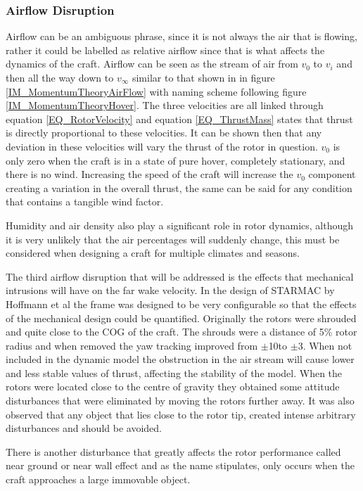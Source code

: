 \subsubsection{Airflow Disruption}
Airflow can be an ambiguous phrase, since it is not always the air that is flowing, rather it could be labelled as relative airflow since that is what affects the dynamics of the craft. Airflow can be seen as the stream of air from $v_0$ to $v_i$ and then all the way down to $v_\infty$ similar to that shown in in figure \ref{IM_MomentumTheoryAirFlow} with naming scheme following figure \ref{IM_MomentumTheoryHover}. The three velocities are all linked through equation \ref{EQ_RotorVelocity} and equation \ref{EQ_ThrustMass} states that thrust is directly proportional to these velocities. It can be shown then that any deviation in these velocities will vary the thrust of the rotor in question. $v_0$ is only zero when the craft is in a state of pure hover, completely stationary, and there is no wind. Increasing the speed of the craft will increase the $v_0$ component creating a variation in the overall thrust, the same can be said for any condition that contains a tangible wind factor. 

Humidity and air density also play a significant role in rotor dynamics, although it is very unlikely that the air percentages will suddenly change, this must be considered when designing a craft for multiple climates and seasons.

The third airflow disruption that will be addressed is the effects that mechanical intrusions will have on the far wake velocity. In the design of STARMAC by Hoffmann et al \cite{Hoffmann} the frame was designed to be very configurable so that the effects of the mechanical design could be quantified. Originally the rotors were shrouded and quite close to the COG of the craft. The shrouds were a distance of 5\% rotor radius and when removed the yaw tracking improved from $\pm$10\textdegree to $\pm$3\textdegree. When not included in the dynamic model the obstruction in the air stream will cause lower and less stable values of thrust, affecting the stability of the model. 
When the rotors were located close to the centre of gravity they obtained some attitude disturbances that were eliminated by moving the rotors further away. It was also observed that any object that lies close to the rotor tip, created intense arbitrary disturbances and should be avoided. 

There is another disturbance that greatly affects the rotor performance called near ground or near wall effect and as the name stipulates, only occurs when the craft approaches a large immovable object.

